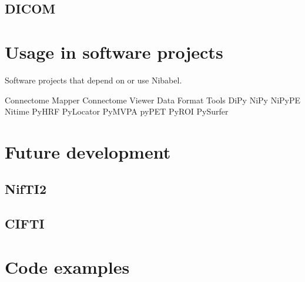 \documentclass[twoside=false,fontsize=11pt,pointednumbers,normalheadings,%
               abstracton,paper=a4,pagesize,pdftex]{scrartcl}
\begin{document}
\subsection{DICOM}


\section{Usage in software projects}

Software projects that depend on or use Nibabel.

Connectome Mapper
Connectome Viewer
Data Format Tools
DiPy
NiPy
NiPyPE
Nitime
PyHRF
PyLocator
PyMVPA \citep{HHS+09b}
pyPET
PyROI
PySurfer

\section{Future development}

\subsection{NifTI2}

\subsection{CIFTI}


\section{Code examples}


%


\end{document}
